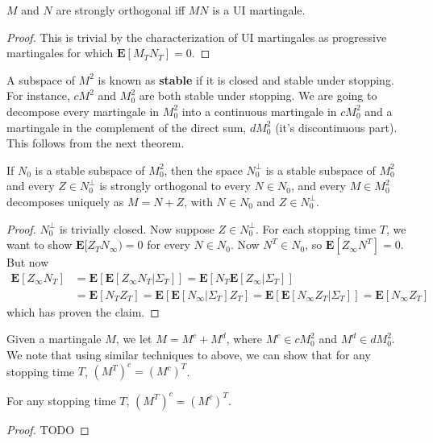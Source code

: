 \begin{lemma}
    $M$ and $N$ are strongly orthogonal iff $MN$ is a UI martingale.
\end{lemma}
\begin{proof}
    This is trivial by the characterization of UI martingales as progressive martingales for which $\mathbf{E}[M_T N_T] = 0$.
\end{proof}

A subspace of $M^2$ is known as {\bf stable} if it is closed and stable under stopping. For instance, $cM^2$ and $M^2_0$ are both stable under stopping. We are going to decompose every martingale in $M_0^2$ into a continuous martingale in $cM_0^2$ and a martingale in the complement of the direct sum, $dM_0^2$ (it's discontinuous part). This follows from the next theorem.

\begin{theorem}
    If $N_0$ is a stable subspace of $M^2_0$, then the space $N_0^\perp$ is a stable subspace of $M^2_0$ and every $Z \in N_0^\perp$ is strongly orthogonal to every $N \in N_0$, and every $M \in M_0^2$ decomposes uniquely as $M = N + Z$, with $N \in N_0$ and $Z \in N_0^\perp$.
\end{theorem}
\begin{proof}
    $N_0^\perp$ is trivially closed. Now suppose $Z \in N_0^\perp$. For each stopping time $T$, we want to show $\mathbf{E}[Z_T N_\infty) = 0$ for every $N \in N_0$. Now $N^T \in N_0$, so $\mathbf{E}[Z_\infty N^T] = 0$. But now
    \begin{align*}
        \mathbf{E}[Z_\infty N_T] &= \mathbf{E}[\mathbf{E}[Z_\infty N_T|\Sigma_T]] = \mathbf{E}[N_T \mathbf{E}[Z_\infty | \Sigma_T]]\\
        &= \mathbf{E}[N_TZ_T] = \mathbf{E}[\mathbf{E}[N_\infty | \Sigma_T] Z_T] = \mathbf{E}[\mathbf{E}[N_\infty Z_T | \Sigma_T]] = \mathbf{E}[N_\infty Z_T]
    \end{align*}
    which has proven the claim.
\end{proof}

Given a martingale $M$, we let $M = M^c + M^d$, where $M^c \in cM^2_0$ and $M^d \in dM^2_0$. We note that using similar techniques to above, we can show that for any stopping time $T$, $(M^T)^c = (M^c)^T$.

\begin{theorem}
    For any stopping time $T$, $(M^T)^c = (M^c)^T$.
\end{theorem}
\begin{proof}
    TODO
\end{proof}

